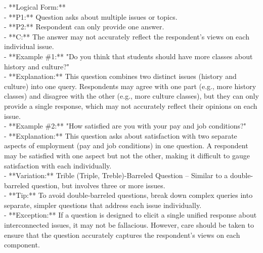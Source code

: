 \documentclass[a4paper,12pt,single,pdftex]{scrbook}
\begin{document}
    
      - **Logical Form:**
    \\

    
        - **P1:** Question asks about multiple issues or topics.
    \\

    
        - **P2:** Respondent can only provide one answer.
    \\

    
        - **C:** The answer may not accurately reflect the respondent's views on each individual issue.
    \\

    
      - **Example \#1:** "Do you think that students should have more classes about history and culture?"
    \\

    
      - **Explanation:** This question combines two distinct issues (history and culture) into one query. Respondents may agree with one part (e.g., more history classes) and disagree with the other (e.g., more culture classes), but they can only provide a single response, which may not accurately reflect their opinions on each issue.
    \\

    
      - **Example \#2:** "How satisfied are you with your pay and job conditions?"
    \\

    
      - **Explanation:** This question asks about satisfaction with two separate aspects of employment (pay and job conditions) in one question. A respondent may be satisfied with one aspect but not the other, making it difficult to gauge satisfaction with each individually.
    \\

    
      - **Variation:** Trible (Triple, Treble)-Barreled Question – Similar to a double-barreled question, but involves three or more issues.
    \\

    
      - **Tip:** To avoid double-barreled questions, break down complex queries into separate, simpler questions that address each issue individually.
    \\

    
      - **Exception:** If a question is designed to elicit a single unified response about interconnected issues, it may not be fallacious. However, care should be taken to ensure that the question accurately captures the respondent's views on each component.
    \\
\end{document}
